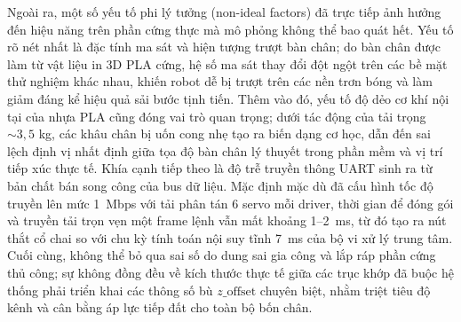 Ngoài ra, một số yếu tố phi lý tưởng (non-ideal factors) đã trực tiếp ảnh hưởng đến hiệu năng trên phần cứng thực mà mô phỏng không thể bao quát hết. Yếu tố rõ nét nhất là đặc tính ma sát và hiện tượng trượt bàn chân; do bàn chân được làm từ vật liệu in 3D PLA cứng, hệ số ma sát thay đổi đột ngột trên các bề mặt thử nghiệm khác nhau, khiến robot dễ bị trượt trên các nền trơn bóng và làm giảm đáng kể hiệu quả sải bước tịnh tiến. Thêm vào đó, yếu tố độ dẻo cơ khí nội tại của nhựa PLA cũng đóng vai trò quan trọng; dưới tác động của tải trọng $\sim 3{,}5$ kg, các khâu chân bị uốn cong nhẹ tạo ra biến dạng cơ học, dẫn đến sai lệch định vị nhất định giữa tọa độ bàn chân lý thuyết trong phần mềm và vị trí tiếp xúc thực tế. Khía cạnh tiếp theo là độ trễ truyền thông UART sinh ra từ bản chất bán song công của bus dữ liệu. Mặc định mặc dù đã cấu hình tốc độ truyền lên mức 1~Mbps với tải phân tán 6 servo mỗi driver, thời gian để đóng gói và truyền tải trọn vẹn một frame lệnh vẫn mất khoảng 1--2~ms, từ đó tạo ra nút thắt cổ chai so với chu kỳ tính toán nội suy tĩnh 7~ms của bộ vi xử lý trung tâm. Cuối cùng, không thể bỏ qua sai số do dung sai gia công và lắp ráp phần cứng thủ công; sự không đồng đều về kích thước thực tế giữa các trục khớp đã buộc hệ thống phải triển khai các thông số bù $z\_\text{offset}$ chuyên biệt, nhằm triệt tiêu độ kênh và cân bằng áp lực tiếp đất cho toàn bộ bốn chân.

